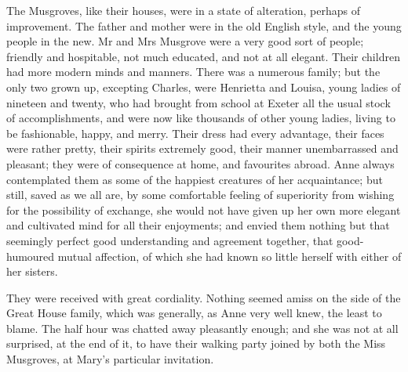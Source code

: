 The Musgroves, like their houses, were in a state of alteration, perhaps of improvement. The father and mother were in the old English style, and the young people in the new. Mr and Mrs Musgrove were a very good sort of people; friendly and hospitable, not much educated, and not at all elegant. Their children had more modern minds and manners. There was a numerous family; but the only two grown up, excepting Charles, were Henrietta and Louisa, young ladies of nineteen and twenty, who had brought from school at Exeter all the usual stock of accomplishments, and were now like thousands of other young ladies, living to be fashionable, happy, and merry. Their dress had every advantage, their faces were rather pretty, their spirits extremely good, their manner unembarrassed and pleasant; they were of consequence at home, and favourites abroad. Anne always contemplated them as some of the happiest creatures of her acquaintance; but still, saved as we all are, by some comfortable feeling of superiority from wishing for the possibility of exchange, she would not have given up her own more elegant and cultivated mind for all their enjoyments; and envied them nothing but that seemingly perfect good understanding and agreement together, that good-humoured mutual affection, of which she had known so little herself with either of her sisters.

They were received with great cordiality. Nothing seemed amiss on the side of the Great House family, which was generally, as Anne very well knew, the least to blame. The half hour was chatted away pleasantly enough; and she was not at all surprised, at the end of it, to have their walking party joined by both the Miss Musgroves, at Mary's particular invitation.